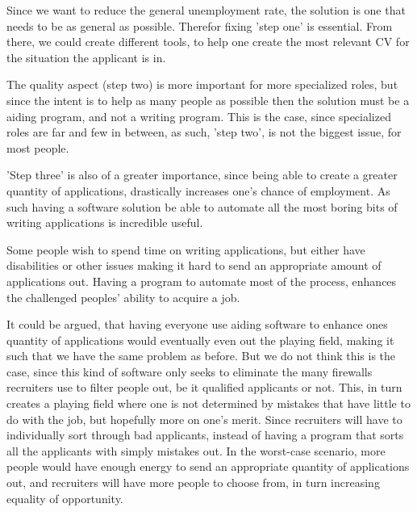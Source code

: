 Since we want to reduce the general unemployment rate, the solution is one that needs to 
be as general as possible. Therefor fixing 'step one' is essential.
From there, we could create different tools, to help one create the most relevant
CV for the situation the applicant is in.

The quality aspect (step two) is more important for more specialized roles, 
but since the intent is to help as many people as possible then the solution
must be a aiding program, and not a writing program.
This is the case, since specialized roles are far and few in between,
as such, 'step two', is not the biggest issue, for most people. 

'Step three' is also of a greater importance, since being able to create a
greater quantity of applications, drastically increases one's chance of
employment. 
As such having a software solution be able to automate all the most boring
bits of writing applications is incredible useful.

Some people wish to spend time on writing applications, but either have
disabilities or other issues making it hard to send an appropriate amount
of applications out. Having a program to automate most of the process, enhances
the challenged peoples' ability to acquire a job.

It could be argued, that having everyone use aiding software to enhance ones
quantity of applications would eventually even out the playing field, making
it such that we have the same problem as before. 
But we do not think this is the case, since this kind of software only seeks
to eliminate the many firewalls recruiters use to filter people out, be it 
qualified applicants or not.
This, in turn creates a playing field  where one is not determined by
mistakes that have little to do with the job, but hopefully more on one's merit. 
Since recruiters will have to individually sort through bad applicants, instead of having 
a program that sorts all the applicants with simply mistakes out. In the worst-case scenario, more
people would have enough energy to send an appropriate quantity of applications
out, and recruiters will have more people to choose from, in turn increasing
equality of opportunity.

